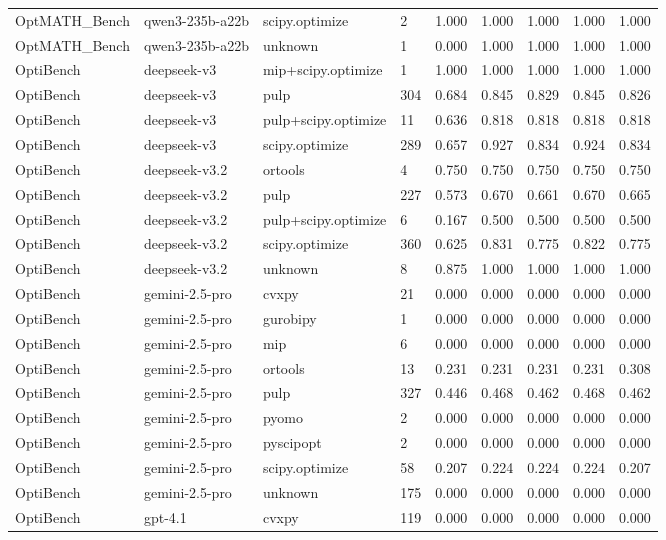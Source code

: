 \begin{table}[t]
\begin{tabular}{lllllllll}
OptMATH\_Bench & qwen3-235b-a22b & scipy.optimize & 2 & 1.000 & 1.000 & 1.000 & 1.000 & 1.000 \\
OptMATH\_Bench & qwen3-235b-a22b & unknown & 1 & 0.000 & 1.000 & 1.000 & 1.000 & 1.000 \\
OptiBench & deepseek-v3 & mip+scipy.optimize & 1 & 1.000 & 1.000 & 1.000 & 1.000 & 1.000 \\
OptiBench & deepseek-v3 & pulp & 304 & 0.684 & 0.845 & 0.829 & 0.845 & 0.826 \\
OptiBench & deepseek-v3 & pulp+scipy.optimize & 11 & 0.636 & 0.818 & 0.818 & 0.818 & 0.818 \\
OptiBench & deepseek-v3 & scipy.optimize & 289 & 0.657 & 0.927 & 0.834 & 0.924 & 0.834 \\
OptiBench & deepseek-v3.2 & ortools & 4 & 0.750 & 0.750 & 0.750 & 0.750 & 0.750 \\
OptiBench & deepseek-v3.2 & pulp & 227 & 0.573 & 0.670 & 0.661 & 0.670 & 0.665 \\
OptiBench & deepseek-v3.2 & pulp+scipy.optimize & 6 & 0.167 & 0.500 & 0.500 & 0.500 & 0.500 \\
OptiBench & deepseek-v3.2 & scipy.optimize & 360 & 0.625 & 0.831 & 0.775 & 0.822 & 0.775 \\
OptiBench & deepseek-v3.2 & unknown & 8 & 0.875 & 1.000 & 1.000 & 1.000 & 1.000 \\
OptiBench & gemini-2.5-pro & cvxpy & 21 & 0.000 & 0.000 & 0.000 & 0.000 & 0.000 \\
OptiBench & gemini-2.5-pro & gurobipy & 1 & 0.000 & 0.000 & 0.000 & 0.000 & 0.000 \\
OptiBench & gemini-2.5-pro & mip & 6 & 0.000 & 0.000 & 0.000 & 0.000 & 0.000 \\
OptiBench & gemini-2.5-pro & ortools & 13 & 0.231 & 0.231 & 0.231 & 0.231 & 0.308 \\
OptiBench & gemini-2.5-pro & pulp & 327 & 0.446 & 0.468 & 0.462 & 0.468 & 0.462 \\
OptiBench & gemini-2.5-pro & pyomo & 2 & 0.000 & 0.000 & 0.000 & 0.000 & 0.000 \\
OptiBench & gemini-2.5-pro & pyscipopt & 2 & 0.000 & 0.000 & 0.000 & 0.000 & 0.000 \\
OptiBench & gemini-2.5-pro & scipy.optimize & 58 & 0.207 & 0.224 & 0.224 & 0.224 & 0.207 \\
OptiBench & gemini-2.5-pro & unknown & 175 & 0.000 & 0.000 & 0.000 & 0.000 & 0.000 \\
OptiBench & gpt-4.1 & cvxpy & 119 & 0.000 & 0.000 & 0.000 & 0.000 & 0.000 \\

\end{tabular}
\end{table}
